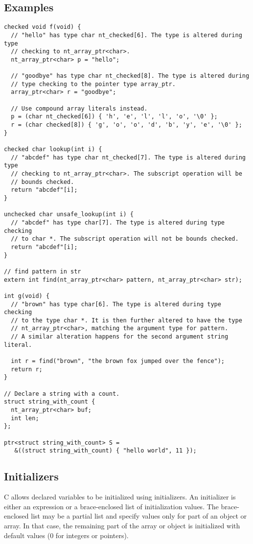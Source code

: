 \subsection{Examples}
\begin{lstlisting}
checked void f(void) {
  // "hello" has type char nt_checked[6]. The type is altered during type
  // checking to nt_array_ptr<char>.
  nt_array_ptr<char> p = "hello";

  // "goodbye" has type char nt_checked[8]. The type is altered during 
  // type checking to the pointer type array_ptr.
  array_ptr<char> r = "goodbye";

  // Use compound array literals instead.
  p = (char nt_checked[6]) { 'h', 'e', 'l', 'l', 'o', '\0' };
  r = (char checked[8]) { 'g', 'o', 'o', 'd', 'b', 'y', 'e', '\0' };
}

checked char lookup(int i) {
  // "abcdef" has type char nt_checked[7]. The type is altered during type
  // checking to nt_array_ptr<char>. The subscript operation will be
  // bounds checked.
  return "abcdef"[i];
}

unchecked char unsafe_lookup(int i) {
  // "abcdef" has type char[7]. The type is altered during type checking
  // to char *. The subscript operation will not be bounds checked.
  return "abcdef"[i];
}

// find pattern in str
extern int find(nt_array_ptr<char> pattern, nt_array_ptr<char> str);

int g(void) {
  // "brown" has type char[6]. The type is altered during type checking
  // to the type char *. It is then further altered to have the type
  // nt_array_ptr<char>, matching the argument type for pattern.
  // A similar alteration happens for the second argument string literal.

  int r = find("brown", "the brown fox jumped over the fence");
  return r;
}

// Declare a string with a count.
struct string_with_count {
  nt_array_ptr<char> buf;
  int len;
};

ptr<struct string_with_count> S =
   &((struct string_with_count) { "hello world", 11 });
\end{lstlisting}

\subsection{Initializers}
C allows declared variables to be initialized using initializers.  An initializer
is either an expression or a brace-enclosed list of initialization values.
The brace-enclosed list may be a partial list and specify values only for
part of an object or array.  In that case, the remaining part of the
array or object is initialized with default values (0 for integers or
pointers).

